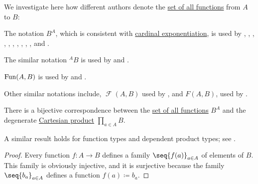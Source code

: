 \begin{remark}\label{rem:set_of_all_functions_notation}
  We investigate here how different authors denote the \hyperref[def:set_of_all_functions]{set of all functions} from \( A \) to \( B \):
  \begin{thmenum}
     The notation \( B^A \), which is consistent with \hyperref[def:cardinal_arithmetic/exponentiation]{cardinal exponentiation}, is used by
    ,
    ,
    ,
    ,
    ,
    ,
    ,
    ,
    ,
    ,
     and
    .

    The similar notation \( {}^A B \) is used by
     and
    .

     \( \op{Fun}(A, B) \) is used by
     and
    .

    Other similar notations include, \( \mscrF(A, B) \) used by , and \( F(A, B) \), used by .
  \end{thmenum}
\end{remark}

\begin{proposition}\label{thm:set_of_all_functions_via_cartesian_product}
  There is a bijective correspondence between the \hyperref[def:set_of_all_functions]{set of all functions} \( B^A \) and the degenerate \hyperref[def:cartesian_product]{Cartesian product} \( \prod_{a \in A} B \).
\end{proposition}
\begin{comments}
  \item A similar result holds for function types and dependent product types; see .
\end{comments}
\begin{proof}
  Every function \( f: A \to B \) defines a family \( \seq{ f(a) }_{a \in A} \) of elements of \( B \). This family is obviously injective, and it is surjective because the family \( \seq{ b_a }_{a \in A} \) defines a function \( f(a) \coloneqq b_a \).
\end{proof}

